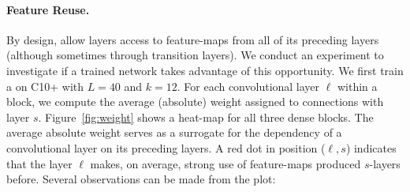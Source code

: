 \paragraph{Feature Reuse.}
By design, \methodnameshorts{} allow layers access to feature-maps from all of its preceding layers (although sometimes through transition layers). We conduct an experiment to investigate if  a trained network takes advantage of this opportunity.
We first train a \methodnameshort{} on C10+ with $L\!=\!40$ and $k\!=\!12$. For each convolutional layer $\ell$ within a block, we compute the average (absolute) weight assigned to connections with layer $s$. Figure~\ref{fig:weight} shows a heat-map for all three dense blocks.
The average absolute weight serves as a surrogate for the dependency of a convolutional layer on its preceding layers.
A red dot in position ($\ell,s$) indicates that the layer $\ell$  makes, on average, strong use of feature-maps produced $s$-layers before.
Several observations can be made from the plot:
\vspace{-2pt}
